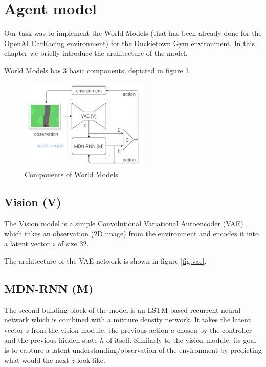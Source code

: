 \documentclass{article}
\begin{document}
\section{Agent model}


Our task was to implement the World Models\cite{worldmodels} (that has been already done for the OpenAI CarRacing environment) for the Duckietown Gym environment. In this chapter we briefly introduce the architecture of the model.

World Models has 3 basic components, depicted in figure \ref{fig:model}.

\begin{figure}
    \centering
    \includegraphics[width=0.55\textwidth]{world_models.png}
    \caption{Components of World Models}
    \label{fig:model}
\end{figure}

\subsection{Vision (V)}

The Vision model is a simple Convolutional Variational Autoencoder (VAE) \cite{vae1}, \cite{vae2} which takes an observation (2D image) from the environment and encodes it into a latent vector $z$ of size 32.

The architecture of the VAE network is shown in figure \ref{fig:vae}.

\subsection{MDN-RNN (M)}

The second building block of the model is an LSTM-based \cite{lstm} recurrent neural network which is combined with a mixture density network\cite{MDN}. It takes the latent vector $z$ from the vision module, the previous action $a$ chosen by the controller and the previous hidden state $h$ of itself. Similarly to the vision module, its goal is to capture a latent understanding/observation of the environment by predicting what would the next $z$ look like.
\end{document}
